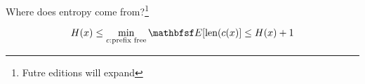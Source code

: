 

Where does entropy come from?\footnote{Futre editions will expand}


\[
  H(x) \leq \min_{c: \text{prefix free}} \E[\text{len}(c(x)] \leq H(x) + 1
\]



\blankpage
